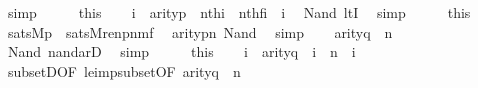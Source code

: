 \begin{isabellebody}
\ simp\isanewline
\ \ \isamarkupfalse%
\ \isamarkupfalse%
\ this\isanewline
\ \ \isamarkupfalse%
\ {\isachardoublequoteopen}i\ {\isasymin}\ arity{\isacharparenleft}{\kern0pt}p{\isacharparenright}{\kern0pt}\ {\isasymLongrightarrow}\ nth{\isacharparenleft}{\kern0pt}i{\isacharcomma}{\kern0pt}{\isasymrho}{\isacharparenright}{\kern0pt}\ {\isacharequal}{\kern0pt}\ nth{\isacharparenleft}{\kern0pt}f{\isacharbackquote}{\kern0pt}i{\isacharcomma}{\kern0pt}{\isasymrho}{\isacharprime}{\kern0pt}{\isacharparenright}{\kern0pt}{\isachardoublequoteclose}\ \ i\ \isamarkupfalse%
\ Nand\ ltI\ \isamarkupfalse%
\ simp\isanewline
\ \ \isamarkupfalse%
\ \isamarkupfalse%
\ this\isanewline
\ \ \isamarkupfalse%
\ {\isachardoublequoteopen}sats{\isacharparenleft}{\kern0pt}M{\isacharcomma}{\kern0pt}p{\isacharcomma}{\kern0pt}{\isasymrho}{\isacharparenright}{\kern0pt}\ {\isasymlongleftrightarrow}\ sats{\isacharparenleft}{\kern0pt}M{\isacharcomma}{\kern0pt}ren{\isacharparenleft}{\kern0pt}p{\isacharparenright}{\kern0pt}{\isacharbackquote}{\kern0pt}n{\isacharbackquote}{\kern0pt}m{\isacharbackquote}{\kern0pt}f{\isacharcomma}{\kern0pt}{\isasymrho}{\isacharprime}{\kern0pt}{\isacharparenright}{\kern0pt}{\isachardoublequoteclose}\ \isamarkupfalse%
\ {\isacartoucheopen}arity{\isacharparenleft}{\kern0pt}p{\isacharparenright}{\kern0pt}{\isasymle}n{\isacartoucheclose}\ Nand\ \isamarkupfalse%
\ simp\isanewline
\ \ \isamarkupfalse%
\ {\isachardoublequoteopen}arity{\isacharparenleft}{\kern0pt}q{\isacharparenright}{\kern0pt}\ {\isasymle}\ n{\isachardoublequoteclose}\ \isamarkupfalse%
\ Nand\ nand{\isacharunderscore}{\kern0pt}ar{}D\ \isamarkupfalse%
\ simp\isanewline
\ \ \isamarkupfalse%
\ \isamarkupfalse%
\ this\isanewline
\ \ \isamarkupfalse%
\ {\isachardoublequoteopen}i\ {\isasymin}\ arity{\isacharparenleft}{\kern0pt}q{\isacharparenright}{\kern0pt}\ {\isasymLongrightarrow}\ i\ {\isasymin}\ n{\isachardoublequoteclose}\ \ i\ \isamarkupfalse%
\ subsetD{\isacharbrackleft}{\kern0pt}OF\ le{\isacharunderscore}{\kern0pt}imp{\isacharunderscore}{\kern0pt}subset{\isacharbrackleft}{\kern0pt}OF\ {\isacartoucheopen}arity{\isacharparenleft}{\kern0pt}q{\isacharparenright}{\kern0pt}\ {\isasymle}\ n{\isacartoucheclose}{\isacharbrackright}{\kern0pt}{\isacharbrackright}{\kern0pt}\ \isamarkupfalse%

\end{isabellebody}

